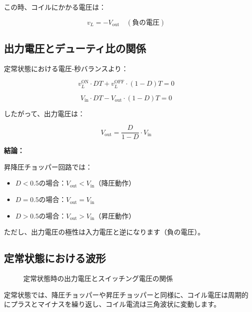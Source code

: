 この時、コイルにかかる電圧は：

\begin{equation}
v_L = -V_{\text{out}} \quad (\text{負の電圧})
\end{equation}

\subsection{出力電圧とデューティ比の関係}

定常状態における電圧-秒バランスより：

\begin{equation}
v_L^{\text{ON}} \cdot DT + v_L^{\text{OFF}} \cdot (1-D)T = 0
\end{equation}

\begin{equation}
V_{\text{in}} \cdot DT - V_{\text{out}} \cdot (1-D)T = 0
\end{equation}

したがって、出力電圧は：

\begin{equation}
\boxed{V_{\text{out}} = \frac{D}{1-D} \cdot V_{\text{in}}}
\end{equation}

\textbf{結論：}

昇降圧チョッパー回路では：

\begin{itemize}
\item $D < 0.5$の場合：$V_{\text{out}} < V_{\text{in}}$（降圧動作）
\item $D = 0.5$の場合：$V_{\text{out}} = V_{\text{in}}$
\item $D > 0.5$の場合：$V_{\text{out}} > V_{\text{in}}$（昇圧動作）
\end{itemize}

ただし、出力電圧の極性は入力電圧と逆になります（負の電圧）。

\subsection{定常状態における波形}

\begin{figure}[H]
\centering
{}
\caption{定常状態時の出力電圧とスイッチング電圧の関係}
\label{fig:ch05_buckboost_waveforms}
\end{figure}

定常状態では、降圧チョッパーや昇圧チョッパーと同様に、コイル電圧は周期的にプラスとマイナスを繰り返し、コイル電流は三角波状に変動します。

